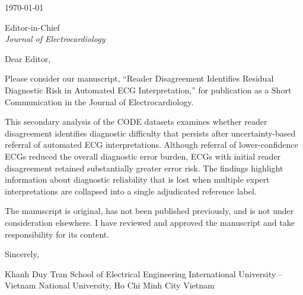 \documentclass[12pt]{article}
\begin{document}
\today

\vspace{1em}

Editor-in-Chief\\
\textit{Journal of Electrocardiology}

\vspace{1em}

Dear Editor,

Please consider our manuscript, “Reader Disagreement Identifies Residual
Diagnostic Risk in Automated ECG Interpretation,” for publication as a Short
Communication in the Journal of Electrocardiology.

This secondary analysis of the CODE datasets examines whether reader
disagreement identifies diagnostic difficulty that persists after
uncertainty-based referral of automated ECG interpretations. Although referral
of lower-confidence ECGs reduced the overall diagnostic error burden, ECGs
with initial reader disagreement retained substantially greater error risk.
The findings highlight information about diagnostic reliability that is lost
when multiple expert interpretations are collapsed into a single adjudicated
reference label.

The manuscript is original, has not been published previously, and is not
under consideration elsewhere. I have reviewed and approved the manuscript
and take responsibility for its content.

Sincerely,

Khanh Duy Tran
School of Electrical Engineering
International University – Vietnam National University, Ho Chi Minh City
Vietnam
\end{document}
